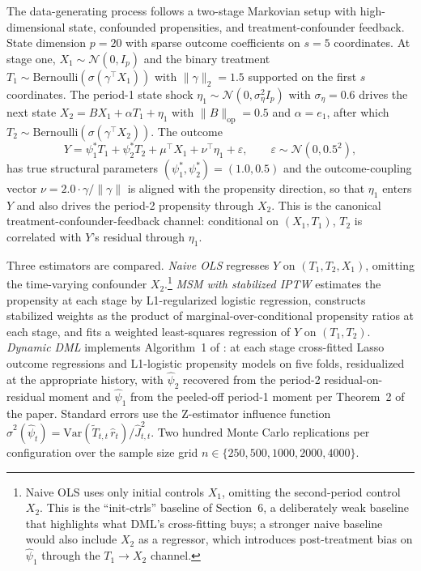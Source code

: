 The data-generating process follows a two-stage Markovian setup with high-dimensional state, confounded propensities, and treatment-confounder feedback. State dimension $p = 20$ with sparse outcome coefficients on $s = 5$ coordinates. At stage one, $X_1 \sim \mathcal{N}(0, I_p)$ and the binary treatment $T_1 \sim \mathrm{Bernoulli}(\sigma(\gamma^\top X_1))$ with $\|\gamma\|_2 = 1.5$ supported on the first $s$ coordinates. The period-1 state shock $\eta_1 \sim \mathcal{N}(0, \sigma_\eta^2 I_p)$ with $\sigma_\eta = 0.6$ drives the next state $X_2 = B X_1 + \alpha T_1 + \eta_1$ with $\|B\|_{\mathrm{op}} = 0.5$ and $\alpha = e_1$, after which $T_2 \sim \mathrm{Bernoulli}(\sigma(\gamma^\top X_2))$. The outcome
\begin{equation}
Y = \psi_1^* T_1 + \psi_2^* T_2 + \mu^\top X_1 + \nu^\top \eta_1 + \varepsilon, \qquad \varepsilon \sim \mathcal{N}(0, 0.5^2),
\label{eq:simB1_dgp}
\end{equation}
has true structural parameters $(\psi_1^*, \psi_2^*) = (1.0, 0.5)$ and the outcome-coupling vector $\nu = 2.0 \cdot \gamma / \|\gamma\|$ is aligned with the propensity direction, so that $\eta_1$ enters $Y$ and also drives the period-2 propensity through $X_2$. This is the canonical treatment-confounder-feedback channel: conditional on $(X_1, T_1)$, $T_2$ is correlated with $Y$'s residual through $\eta_1$.

Three estimators are compared. \emph{Naive OLS} regresses $Y$ on $(T_1, T_2, X_1)$, omitting the time-varying confounder $X_2$.\footnote{Naive OLS uses only initial controls $X_1$, omitting the second-period control $X_2$. This is the ``init-ctrls'' baseline of \citet{lewisSyrgkanis2021dynamicDML} Section~6, a deliberately weak baseline that highlights what DML's cross-fitting buys; a stronger naive baseline would also include $X_2$ as a regressor, which introduces post-treatment bias on $\hat\psi_1$ through the $T_1 \to X_2$ channel.} \emph{MSM with stabilized IPTW} estimates the propensity at each stage by L1-regularized logistic regression, constructs stabilized weights as the product of marginal-over-conditional propensity ratios at each stage, and fits a weighted least-squares regression of $Y$ on $(T_1, T_2)$. \emph{Dynamic DML} implements Algorithm~1 of \citet{lewisSyrgkanis2021dynamicDML}: at each stage cross-fitted Lasso outcome regressions and L1-logistic propensity models on five folds, residualized at the appropriate history, with $\hat\psi_2$ recovered from the period-2 residual-on-residual moment and $\hat\psi_1$ from the peeled-off period-1 moment per Theorem~2 of the paper. Standard errors use the Z-estimator influence function $\hat\sigma^2(\hat\psi_t) = \mathrm{Var}(\tilde T_{t,t}\,\hat r_t) / \hat J_{t,t}^2$. Two hundred Monte Carlo replications per configuration over the sample size grid $n \in \{250, 500, 1000, 2000, 4000\}$.

